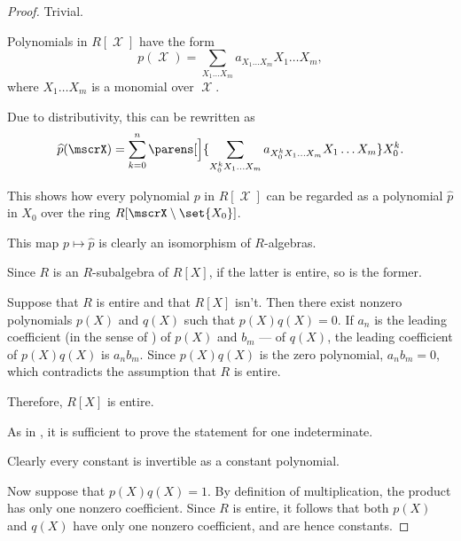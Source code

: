 \begin{proof}
   Trivial.

   Polynomials in \( R[\mscrX] \) have the form
  \begin{equation*}
    p(\mscrX) = \sum_{X_1 \ldots X_m} a_{X_1 \ldots X_m} X_1 \ldots X_m,
  \end{equation*}
  where \( X_1 \ldots X_m \) is a monomial over \( \mscrX \).

  Due to distributivity, this can be rewritten as
  \begin{equation*}
    \widehat{p}(\mscrX) = \sum_{k=0}^n \parens[\Big]{ \sum_{X_0^k X_1 \ldots X_m} a_{X_0^k X_1 \ldots X_m} X_1 \ldots X_m } X_0^k.
  \end{equation*}

  This shows how every polynomial \( p \) in \( R[\mscrX] \) can be regarded as a polynomial \( \widehat{p} \) in \( X_0 \) over the ring \( R[\mscrX \setminus \set{ X_0 }] \).

  This map \( p \mapsto \widehat{p} \) is clearly an isomorphism of \( R \)-algebras.


  \SufficiencySubProof Since \( R \) is an \( R \)-subalgebra of \( R[X] \), if the latter is entire, so is the former.

  \NecessitySubProof Suppose that \( R \) is entire and that \( R[X] \) isn't. Then there exist nonzero polynomials \( p(X) \) and \( q(X) \) such that \( p(X) q(X) = 0 \). If \( a_n \) is the leading coefficient (in the sense of ) of \( p(X) \) and \( b_m \) --- of \( q(X) \), the leading coefficient of \( p(X) q(X) \) is \( a_n b_m \). Since \( p(X) q(X) \) is the zero polynomial, \( a_n b_m = 0 \), which contradicts the assumption that \( R \) is entire.

  Therefore, \( R[X] \) is entire.

   As in , it is sufficient to prove the statement for one indeterminate.

  Clearly every constant is invertible as a constant polynomial.

  Now suppose that \( p(X) q(X) = 1 \). By definition of multiplication, the product has only one nonzero coefficient. Since \( R \) is entire, it follows that both \( p(X) \) and \( q(X) \) have only one nonzero coefficient, and are hence constants.
\end{proof}

